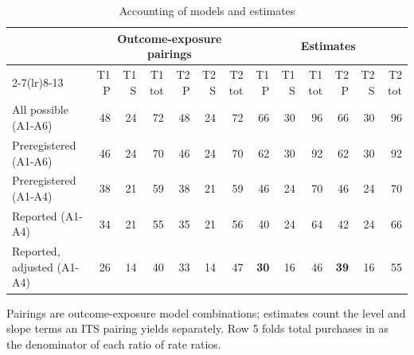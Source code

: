 \begin{table}[H]
\centering
\small
\caption{Accounting of models and estimates}
\label{tab:estimate_accounting}
\begin{tabular}{lrrrrrrrrrrrr}
\toprule
 & \multicolumn{6}{c}{Outcome-exposure pairings} & \multicolumn{6}{c}{Estimates} \\
\cmidrule(lr){2-7}\cmidrule(lr){8-13}
 & T1 P & T1 S & T1 tot & T2 P & T2 S & T2 tot & T1 P & T1 S & T1 tot & T2 P & T2 S & T2 tot \\
\midrule
All possible (A1-A6) & 48 & 24 & 72 & 48 & 24 & 72 & 66 & 30 & 96 & 66 & 30 & 96 \\
Preregistered (A1-A6) & 46 & 24 & 70 & 46 & 24 & 70 & 62 & 30 & 92 & 62 & 30 & 92 \\
Preregistered (A1-A4) & 38 & 21 & 59 & 38 & 21 & 59 & 46 & 24 & 70 & 46 & 24 & 70 \\
Reported (A1-A4) & 34 & 21 & 55 & 35 & 21 & 56 & 40 & 24 & 64 & 42 & 24 & 66 \\
Reported, adjusted (A1-A4) & 26 & 14 & 40 & 33 & 14 & 47 & \textbf{30} & 16 & 46 & \textbf{39} & 16 & 55 \\
\bottomrule
\end{tabular}
\par\smallskip\footnotesize Pairings are outcome-exposure model combinations; estimates count the level and slope terms an ITS pairing yields separately. Row 5 folds total purchases in as the denominator of each ratio of rate ratios.
\end{table}
